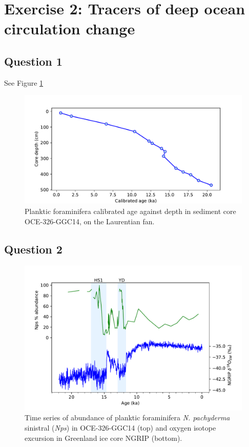 \section{Exercise 2: Tracers of deep ocean circulation change}
\label{sec:E2}

\subsection{Question 1}
\label{sec:Q2.1}
See Figure \ref{fig:age_depth}

\begin{figure}[h]
\includegraphics[width=\textwidth]{img/line_age_depth.pdf}
    \caption{Planktic foraminifera calibrated age against depth in sediment core OCE-326-GGC14, on the Laurentian fan.}
        \label{fig:age_depth}
\end{figure}

\subsection{Question 2}
\label{sec:Q2.2}

\begin{figure}[h]
\includegraphics[width=\textwidth]{img/timeseries_nps_ngrip}
    \caption{Time series of abundance of planktic foraminifera \emph{N. pachyderma} sinistral (\emph{Nps}) in OCE-326-GGC14 (top) and oxygen isotope excursion in Greenland ice core NGRIP (bottom).}
        \label{fig:nps_ngrip}
\end{figure}

